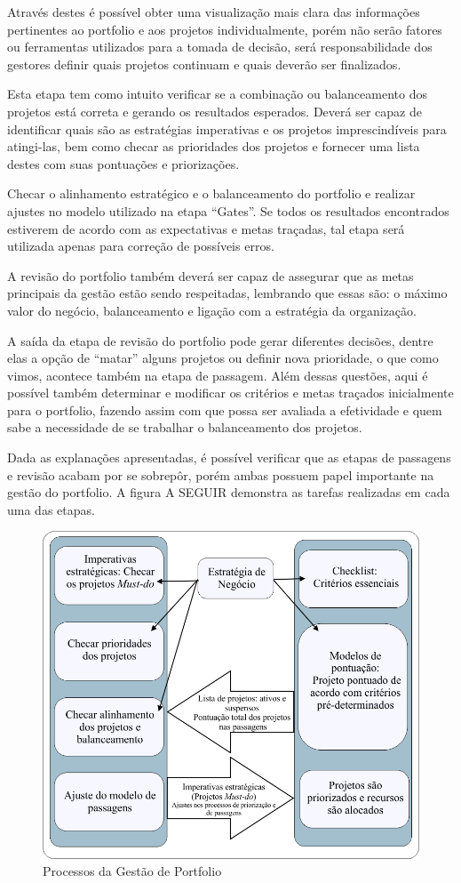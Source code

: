 \documentclass[12pt,a4paper,ruledheader,tocpage=prefix,floatnumber=continuous,pagestart=folhaderosto,font=times]{abnt}
\begin{document}
Através destes é possível obter uma visualização mais clara das informações pertinentes ao portfolio e aos projetos individualmente, 
porém não serão fatores ou ferramentas utilizados para a tomada de decisão, será responsabilidade dos gestores definir quais projetos continuam e quais 
deverão ser finalizados.

Esta etapa tem como intuito verificar se a combinação ou balanceamento dos projetos está correta e gerando os resultados esperados. Deverá ser capaz de
identificar quais são as estratégias imperativas e os projetos imprescindíveis para atingi-las, bem como checar as prioridades dos projetos e fornecer uma
lista destes com suas pontuações e priorizações. 

Checar o alinhamento estratégico e o balanceamento do portfolio e realizar ajustes no modelo utilizado na etapa ``Gates''. Se todos os resultados 
encontrados estiverem de acordo com as expectativas e metas traçadas, tal etapa será utilizada apenas para correção de possíveis erros. 

A revisão do portfolio também deverá ser capaz de assegurar que as metas principais da gestão estão sendo respeitadas, lembrando que 
essas são: o máximo valor do negócio, balanceamento e ligação com a estratégia da organização.

A saída da etapa de revisão do portfolio pode gerar diferentes decisões, dentre elas a opção de ``matar'' alguns projetos ou definir nova prioridade, o que
como vimos, acontece também na etapa de passagem. Além dessas questões, aqui é possível também determinar e modificar os critérios e metas traçados inicialmente
para o portfolio, fazendo assim com que possa ser avaliada a efetividade e quem sabe a necessidade de se trabalhar o balanceamento dos projetos.

Dada as explanações apresentadas, é possível verificar que as etapas de passagens e revisão acabam por se sobrepôr, porém ambas possuem papel
importante na gestão do portfolio. A figura A SEGUIR demonstra as tarefas realizadas em cada uma das etapas.

\begin{figure}[H]
\centering
\includegraphics[width=.7\textwidth]{img/fig9.png}
\caption{Processos da Gestão de Portfolio\cite{COOPER2001}}
\end{figure}
\end{document}
